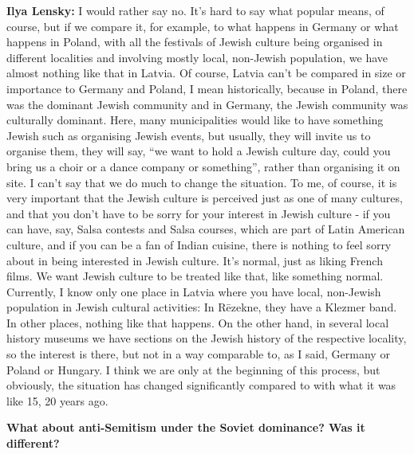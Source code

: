 \textbf{Ilya Lensky:} I would rather say no. It’s hard to say what popular means, of course, but if we compare it, for example, to what happens in Germany or what happens in Poland, with all the festivals of Jewish culture being organised in different localities and involving mostly local, non-Jewish population, we have almost nothing like that in Latvia. Of course, Latvia can’t be compared in size or importance to Germany and Poland, I mean historically, because in Poland, there was the dominant Jewish community and in Germany, the Jewish community was culturally dominant. Here, many municipalities would like to have something Jewish such as organising Jewish events, but usually, they will invite us to organise them, they will say, ``we want to hold a Jewish culture day, could you bring us a choir or a dance company or something'', rather than organising it on site. I can’t say that we do much to change the situation. To me, of course, it is very important that the Jewish culture is perceived just as one of many cultures, and that you don’t have to be sorry for your interest in Jewish culture - if you can have, say, Salsa contests and Salsa courses, which are part of Latin American culture, and if you can be a fan of Indian cuisine, there is nothing to feel sorry about in being interested in Jewish culture. It's normal, just as liking French films. We want Jewish culture to be treated like that, like something normal. Currently, I know only one place in Latvia where you have local, non-Jewish population in Jewish cultural activities: In Rēzekne, they have a Klezmer band. In other places, nothing like that happens. On the other hand, in several local history museums we have sections on the Jewish history of the respective locality, so the interest is there, but not in a way comparable to, as I said, Germany or Poland or Hungary. I think we are only at the beginning of this process, but obviously, the situation has changed significantly compared to with what it was like 15, 20 years ago. 

\textbf{What about anti-Semitism under the Soviet dominance? Was it different?}

